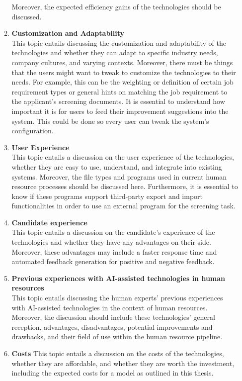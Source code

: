 \documentclass[draft,final]{thesisclass} %
\begin{document}
\begin{enumerate}
\begin{enumerate}
        Moreover, the expected efficiency gains of the technologies should be discussed.
        \item \textbf{Customization and Adaptability}\\
        This topic entails discussing the customization and adaptability of the technologies and whether they can adapt to specific industry needs, company cultures, and varying contexts.
        Moreover, there must be things that the users might want to tweak to customize the technologies to their needs.
        For example, this can be the weighting or definition of certain job requirement types or general hints on matching the job requirement to the applicant's screening documents.
        It is essential to understand how important it is for users to feed their improvement suggestions into the system.
        This could be done so every user can tweak the system's configuration.
        \item \textbf{User Experience}\\
        This topic entails a discussion on the user experience of the technologies, whether they are easy to use, understand, and integrate into existing systems.
        Moreover, the file types and programs used in current human resource processes should be discussed here.
        Furthermore, it is essential to know if these programs support third-party export and import functionalities in order to use an external program for the screening task.
        \item \textbf{Candidate experience}\\
        This topic entails a discussion on the candidate's experience of the technologies and whether they have any advantages on their side.
        Moreover, these advantages may include a faster response time and automated feedback generation for positive and negative feedback.
        \item \textbf{Previous experiences with \acs{AI}-assisted technologies in human resources}\\
        This topic entails discussing the human experts' previous experiences with \acs{AI}-assisted technologies in the context of human resources.
        Moreover, the discussion should include these technologies' general reception, advantages, disadvantages, potential improvements and drawbacks, and their field of use within the human resource pipeline.
        \item \textbf{Costs}
        This topic entails a discussion on the costs of the technologies, whether they are affordable, and whether they are worth the investment, including the expected costs for a model as outlined in this thesis.

\end{enumerate}
\end{enumerate}
\end{document}
